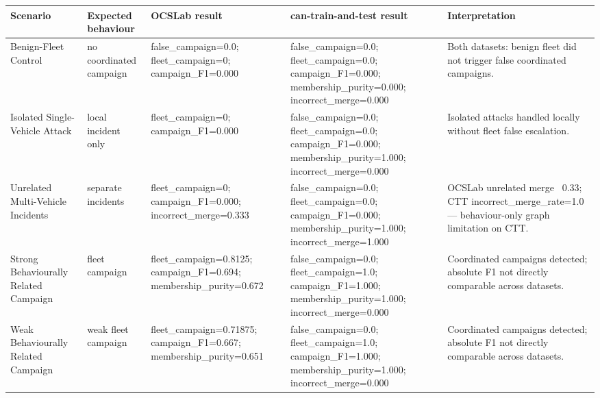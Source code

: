 \begin{tabular}{lllll}
\toprule
Scenario & Expected behaviour & OCSLab result & can-train-and-test result & Interpretation \\
\midrule
Benign-Fleet Control & no coordinated campaign & false_campaign=0.0; fleet_campaign=0; campaign_F1=0.000 & false_campaign=0.0; fleet_campaign=0.0; campaign_F1=0.000; membership_purity=0.000; incorrect_merge=0.000 & Both datasets: benign fleet did not trigger false coordinated campaigns. \\
Isolated Single-Vehicle Attack & local incident only & fleet_campaign=0; campaign_F1=0.000 & false_campaign=0.0; fleet_campaign=0.0; campaign_F1=0.000; membership_purity=1.000; incorrect_merge=0.000 & Isolated attacks handled locally without fleet false escalation. \\
Unrelated Multi-Vehicle Incidents & separate incidents & fleet_campaign=0; campaign_F1=0.000; incorrect_merge=0.333 & false_campaign=0.0; fleet_campaign=0.0; campaign_F1=0.000; membership_purity=1.000; incorrect_merge=1.000 & OCSLab unrelated merge ~0.33; CTT incorrect_merge_rate=1.0 — behaviour-only graph limitation on CTT. \\
Strong Behaviourally Related Campaign & fleet campaign & fleet_campaign=0.8125; campaign_F1=0.694; membership_purity=0.672 & false_campaign=0.0; fleet_campaign=1.0; campaign_F1=1.000; membership_purity=1.000; incorrect_merge=0.000 & Coordinated campaigns detected; absolute F1 not directly comparable across datasets. \\
Weak Behaviourally Related Campaign & weak fleet campaign & fleet_campaign=0.71875; campaign_F1=0.667; membership_purity=0.651 & false_campaign=0.0; fleet_campaign=1.0; campaign_F1=1.000; membership_purity=1.000; incorrect_merge=0.000 & Coordinated campaigns detected; absolute F1 not directly comparable across datasets. \\
\bottomrule
\end{tabular}
